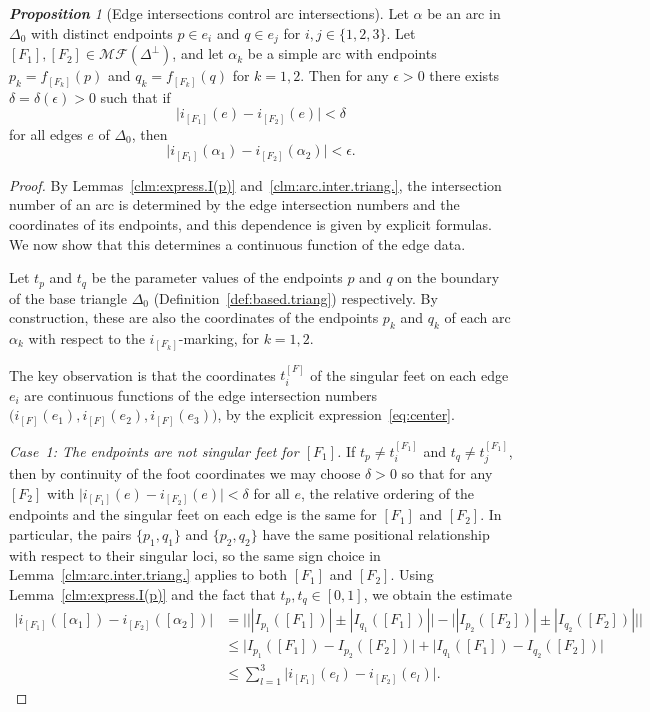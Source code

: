 \documentclass[11pt, letterpaper]{amsart}
\theoremstyle{definition}
\theoremstyle{remark}
\newtheorem{proposition}[theorem]{\rm\bf Proposition}
\numberwithin{equation}{section}
\begin{document}
\begin{proposition}[Edge intersections control arc intersections]
\label{lem:edge.control.arc.MF.triang.}
Let $\alpha$ be an arc in $\Delta_0$ with distinct endpoints
$p\in e_i$ and $q\in e_j$ for $i,j\in\{1,2,3\}$.
Let $[F_1], [F_2] \in \mathcal{MF} (\Delta^{\perp})$, and let $\alpha_k$ be
a simple arc with endpoints $p_k=f_{[F_k]}(p)$ and $q_k=f_{[F_k]}(q)$
for $k=1,2$.
Then for any $\epsilon > 0$ there exists $\delta = \delta (\epsilon) > 0$
such that if
\[
    \big| i_{[F_1]} (e) - i_{[F_2]} (e) \big| < \delta
\]
for all edges $e$ of $\Delta_0$, then
\[
    \big|i_{[F_1]} (\alpha_1) - i_{[F_2]} (\alpha_2)\big| < \epsilon.
\]
\end{proposition}

\begin{proof}
By Lemmas~\ref{clm:express.I(p)} and~\ref{clm:arc.inter.triang.}, the
intersection number of an arc is determined by the edge intersection numbers
and the coordinates of its endpoints, and this dependence is given by explicit formulas.
We now show that this determines a continuous function of the edge data.

Let $t_p$ and $t_q$ be the parameter values of the endpoints $p$ and $q$ on the
boundary of the base triangle $\Delta_0$
(Definition~\ref{def:based.triang}) respectively.
By construction, these are also the coordinates of the endpoints $p_k$ and $q_k$
of each arc $\alpha_k$ with respect to the $i_{[F_k]}$-marking, for $k=1,2$.

The key observation is that the coordinates $t_i^{[F]}$ of the singular feet
on each edge $e_i$ are continuous functions of the edge intersection numbers
$\big(i_{[F]}(e_1), i_{[F]}(e_2), i_{[F]}(e_3)\big)$,
by the explicit expression~\eqref{eq:center}.

\emph{Case~1: The endpoints are not singular feet for $[F_1]$.}
If $t_p \neq t_i^{[F_1]}$ and $t_q \neq t_j^{[F_1]}$, then by continuity of
the foot coordinates we may choose $\delta>0$ so that for any $[F_2]$ with
$\big|i_{[F_1]}(e) - i_{[F_2]}(e)\big| < \delta$ for all $e$, the relative
ordering of the endpoints and the singular feet on each edge is the same for
$[F_1]$ and $[F_2]$.
In particular, the pairs $\{p_1,q_1\}$ and $\{p_2,q_2\}$ have the same
positional relationship with respect to their singular loci, so the same sign
choice in Lemma~\ref{clm:arc.inter.triang.} applies to both $[F_1]$ and $[F_2]$.
Using Lemma~\ref{clm:express.I(p)} and the fact that $t_p,t_q\in[0,1]$, we obtain
the estimate
\begin{equation}\label{eq:estimate-i}
\begin{split}
\big|i_{[F_1]}([\alpha_1])-i_{[F_2]}([\alpha_2])\big|
&= \Big|\big||I_{p_1}([F_1])|\pm|I_{q_1}([F_1])|\big|
       -\big||I_{p_2}([F_2])|\pm|I_{q_2}([F_2])|\big|\Big| \\
&\leq \big|I_{p_1}([F_1])-I_{p_2}([F_2])\big|
      +\big|I_{q_1}([F_1])-I_{q_2}([F_2])\big| \\
&\leq \sum_{l=1}^3 \big|i_{[F_1]}(e_l)-i_{[F_2]}(e_l)\big|.
\end{split}
\end{equation}


\end{proof}
\end{document}
